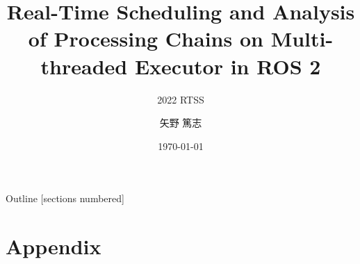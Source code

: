 \newcommand{\beamerDir}[0]{/mnt/c/Users/atsushi/Documents/workspace/env/Beamer/beamer/beamer/}





\title{Real-Time Scheduling and Analysis of Processing Chains on Multi-threaded Executor in ROS 2}
\subtitle{2022 RTSS}
\author{矢野 篤志}
\date{\today}




\maketitle

% 

\begin{frame}{Outline}
    [sections numbered]
    \scriptsize\tableofcontents[hideallsubsections]
\end{frame}

% 
% 



% 
% 
% 

\lastpage

\section*{Appendix}
%     
%     


